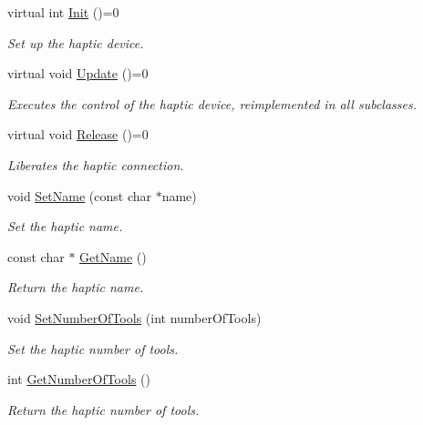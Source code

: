 \begin{DoxyCompactItemize}
\item 
virtual int \hyperlink{classvtkHaptic_a164a353869ace1e3b359da03ce873066}{Init} ()=0
\begin{DoxyCompactList}\small\item\em Set up the haptic device. \item\end{DoxyCompactList}\item 
virtual void \hyperlink{classvtkHaptic_ae05171fc9104c679ebd3bad356104fdb}{Update} ()=0
\begin{DoxyCompactList}\small\item\em Executes the control of the haptic device, reimplemented in all subclasses. \item\end{DoxyCompactList}\item 
virtual void \hyperlink{classvtkHaptic_a6bfd7e7ad232325a84ca586d92b4c3fa}{Release} ()=0
\begin{DoxyCompactList}\small\item\em Liberates the haptic connection. \item\end{DoxyCompactList}\item 
void \hyperlink{classvtkHaptic_a03c7815125924b8771372879ad367e09}{SetName} (const char $\ast$name)
\begin{DoxyCompactList}\small\item\em Set the haptic name. \item\end{DoxyCompactList}\item 
const char $\ast$ \hyperlink{classvtkHaptic_abdf00bb1f22ee8c984982c4e90c729a5}{GetName} ()
\begin{DoxyCompactList}\small\item\em Return the haptic name. \item\end{DoxyCompactList}\item 
void \hyperlink{classvtkHaptic_a2c0be36812179261262d89ae91c31013}{SetNumberOfTools} (int numberOfTools)
\begin{DoxyCompactList}\small\item\em Set the haptic number of tools. \item\end{DoxyCompactList}\item 
int \hyperlink{classvtkHaptic_a6572234c6e1448d8244d1ae7ebad4985}{GetNumberOfTools} ()
\begin{DoxyCompactList}\small\item\em Return the haptic number of tools. \item\end{DoxyCompactList}\end{DoxyCompactItemize}
